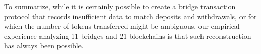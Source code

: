 To summarize, while it is certainly possible to create a bridge
transaction protocol that records insufficient data to match deposits
and withdrawals, or for which the number of tokens transferred might
be ambiguous, our empirical experience analyzing 11 bridges and 21
blockchains is that such reconstruction has always been possible.





